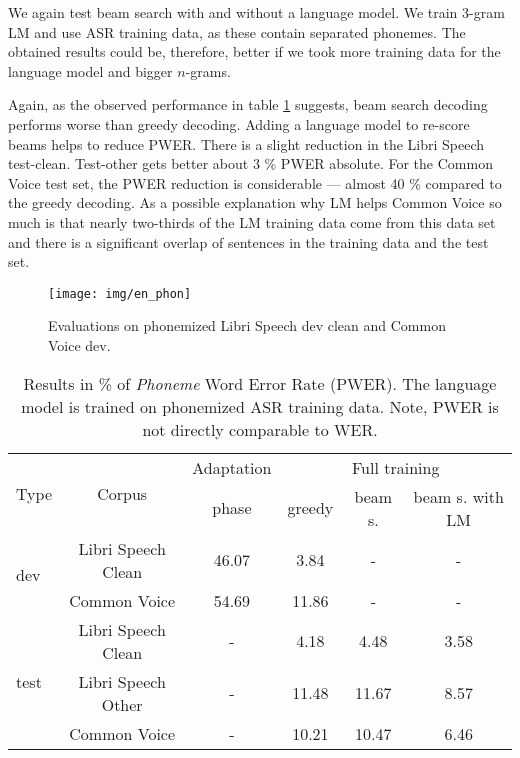 We again test beam search with and without a language model. We train 3-gram LM and use ASR training data, as these contain separated phonemes. The obtained results could be, therefore, better if we took more training data for the language model and bigger $n$-grams.

Again, as the observed performance in table \cref{tab:en_phon_results} suggests, beam search decoding performs worse than greedy decoding. Adding a language model to re-score beams helps to reduce PWER. There is a slight reduction in the Libri Speech test-clean. Test-other gets better about 3 \% PWER absolute. For the Common Voice test set, the PWER reduction is considerable --- almost 40 \% compared to the greedy decoding. As a possible explanation why LM helps Common Voice so much is that nearly two-thirds of the LM training data come from this data set and there is a significant overlap of sentences in the training data and the test set. 

\begin{figure*}[t]
	\texttt{[image: img/en\_phon]}
	\caption{Evaluations on phonemized Libri Speech dev clean and Common Voice dev.}
	\label{fig:en_phon}
\end{figure*}

\begin{table}[t]
	\centering
	\begin{tabular}{lc|c|ccc}
		\multirow{2}{*}{Type} & \multirow{2}{*}{Corpus} & Adaptation & \multicolumn{3}{c}{Full training} \\
		&                    &   phase    & greedy & beam s. & beam s. with LM \\ \hline
		\multirow{2}{*}{dev}   & Libri Speech Clean & 46.07 & 3.84   &      -       &           -          \\
		& Common Voice       & 54.69 & 11.86  &       -      &         -            \\ \hline
		\multirow{3}{*}{test} & Libri Speech Clean & -     & 4.18   & 4.48        & 3.58                \\
		& Libri Speech Other & -     & 11.48  & 11.67       & 8.57                \\
		& Common Voice       & -     & 10.21  & 10.47       & 6.46               
	\end{tabular}
	\caption{Results in \% of \emph{Phoneme} Word Error Rate (PWER). The language model is trained on phonemized ASR training data. Note, PWER is not directly comparable to WER. }
	\label{tab:en_phon_results}
\end{table}



